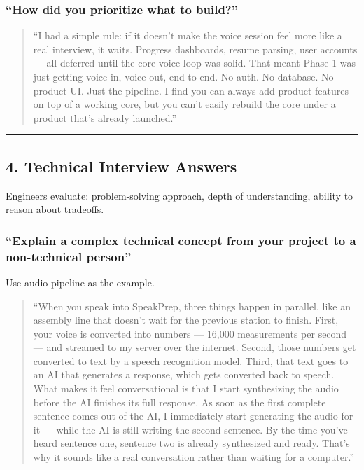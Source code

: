 \documentclass[
  11pt,
]{article}
\begin{document}
\hypertarget{how-did-you-prioritize-what-to-build}{%
\subsubsection{``How did you prioritize what to
build?''}\label{how-did-you-prioritize-what-to-build}}

\begin{quote}
``I had a simple rule: if it doesn't make the voice session feel more
like a real interview, it waits. Progress dashboards, resume parsing,
user accounts --- all deferred until the core voice loop was solid. That
meant Phase 1 was just getting voice in, voice out, end to end. No auth.
No database. No product UI. Just the pipeline. I find you can always add
product features on top of a working core, but you can't easily rebuild
the core under a product that's already launched.''
\end{quote}

\begin{center}\rule{0.5\linewidth}{0.5pt}\end{center}

\hypertarget{technical-interview-answers}{%
\subsection{4. Technical Interview
Answers}\label{technical-interview-answers}}

Engineers evaluate: problem-solving approach, depth of understanding,
ability to reason about tradeoffs.

\hypertarget{explain-a-complex-technical-concept-from-your-project-to-a-non-technical-person}{%
\subsubsection{``Explain a complex technical concept from your project
to a non-technical
person''}\label{explain-a-complex-technical-concept-from-your-project-to-a-non-technical-person}}

Use audio pipeline as the example.

\begin{quote}
``When you speak into SpeakPrep, three things happen in parallel, like
an assembly line that doesn't wait for the previous station to finish.
First, your voice is converted into numbers --- 16,000 measurements per
second --- and streamed to my server over the internet. Second, those
numbers get converted to text by a speech recognition model. Third, that
text goes to an AI that generates a response, which gets converted back
to speech. What makes it feel conversational is that I start
synthesizing the audio before the AI finishes its full response. As soon
as the first complete sentence comes out of the AI, I immediately start
generating the audio for it --- while the AI is still writing the second
sentence. By the time you've heard sentence one, sentence two is already
synthesized and ready. That's why it sounds like a real conversation
rather than waiting for a computer.''
\end{quote}
\end{document}
